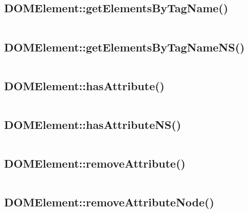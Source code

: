\subsection{DOMElement::getElementsByTagName()}

\begin{lstlisting}[language=PHP]

\end{lstlisting}

\subsection{DOMElement::getElementsByTagNameNS()}

\begin{lstlisting}[language=PHP]

\end{lstlisting}

\subsection{DOMElement::hasAttribute()}

\begin{lstlisting}[language=PHP]

\end{lstlisting}

\subsection{DOMElement::hasAttributeNS()}

\begin{lstlisting}[language=PHP]

\end{lstlisting}

\subsection{DOMElement::removeAttribute()}

\begin{lstlisting}[language=PHP]

\end{lstlisting}


\subsection{DOMElement::removeAttributeNode()}

\begin{lstlisting}[language=PHP]

\end{lstlisting}

